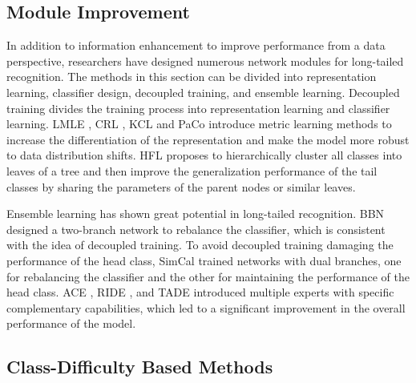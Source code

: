 \documentclass[10pt,twocolumn,letterpaper]{article}
\begin{document}
\subsection*{Module Improvement}
\label{secA.3}

In addition to information enhancement to improve performance from a data perspective, researchers have designed numerous network modules for long-tailed recognition. The methods in this section can be divided into representation learning, classifier design, decoupled training, and ensemble learning. Decoupled training divides the training process into representation learning and classifier learning. LMLE \cite{paper75}, CRL \cite{paper76}, KCL \cite{paper46} and PaCo \cite{paper13} introduce metric learning methods to increase the differentiation of the representation and make the model more robust to data distribution shifts. HFL \cite{paper78} proposes to hierarchically cluster all classes into leaves of a tree and then improve the generalization performance of the tail classes by sharing the parameters of the parent nodes or similar leaves.

Ensemble learning has shown great potential in long-tailed recognition. BBN \cite{paper5} designed a two-branch network to rebalance the classifier, which is consistent with the idea of decoupled training. To avoid decoupled training damaging the performance of the head class, SimCal \cite{paper31} trained networks with dual branches, one for rebalancing the classifier and the other for maintaining the performance of the head class. ACE \cite{paper77}, RIDE \cite{paper7}, and TADE \cite{paper34} introduced multiple experts with specific complementary capabilities, which led to a significant improvement in the overall performance of the model.

\subsection*{Class-Difficulty Based Methods}
\label{secA.4}
\end{document}
